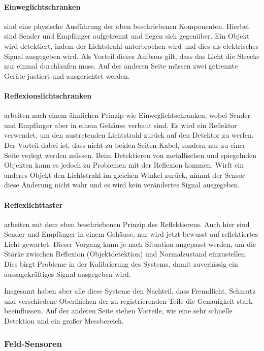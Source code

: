 \paragraph{Einweglichtschranken} sind eine physische Ausführung der oben beschriebenen Komponenten. Hierbei
sind Sender und Empfänger aufgetrennt und liegen sich gegenüber. Ein Objekt wird detektiert, indem der
Lichtstrahl unterbrochen wird und dies als elektrisches Signal ausgegeben wird. Als Vorteil
dieses Aufbaus gilt, dass das Licht die Strecke nur einmal durchlaufen muss. Auf der anderen Seite müssen zwei getrennte
Geräte justiert und ausgerichtet werden.

\paragraph{Reflexionslichtschranken} arbeiten nach einem ähnlichen Prinzip wie Einweglichtschranken, wobei Sender und Empfänger aber
in einem Gehäuse verbaut sind. Es wird ein Reflektor verwendet, um den austretenden Lichtstrahl zurück auf
den Detektor zu werfen. Der Vorteil dabei ist, dass nicht zu beiden Seiten Kabel, sondern nur zu einer Seite
verlegt werden müssen. Beim Detektieren von metallischen und spiegelnden Objekten kann es jedoch zu Problemen mit
der Reflexion kommen. Wirft ein anderes Objekt den Lichtstrahl im gleichen Winkel zurück, nimmt der Sensor diese
Änderung nicht wahr und es wird kein verändertes Signal ausgegeben.

\paragraph{Reflexlichttaster} arbeiten mit dem eben beschriebenen Prinzip des Reflektierens. Auch
hier sind Sender und Empfänger in einem Gehäuse, nur wird jetzt bewusst auf reflektiertes Licht gewartet.
Dieser Vorgang kann je nach Situation angepasst werden, um die Stärke zwischen Reflexion (Objektdetektion) und Normalzustand einzustellen. Dies
birgt Probleme in der Kalibrierung des Systems, damit zuverlässig ein aussagekräftiges Signal ausgegeben wird.

Insgesamt haben aber alle diese Systeme den Nachteil, dass Fremdlicht, Schmutz und verschiedene Oberflächen
der zu registrierenden Teile die Genauigkeit stark beeinflussen.
Auf der anderen Seite stehen Vorteile, wie eine sehr schnelle Detektion und ein großer Messbereich.
%
%
\subsubsection{Feld-Sensoren}
%
